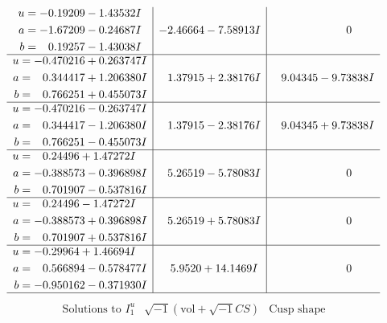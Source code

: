 \documentclass[1p]{elsarticle_modified}
\theoremstyle{definition}
\newcommand{\I}{\sqrt{-1}}
\begin{document}
$$\begin{array}{c|c|c}
\begin{aligned}
u &= -0.19209 - 1.43532 I \\
a &= -1.67209 - 0.24687 I \\
b &= \phantom{-}0.19257 - 1.43038 I\end{aligned}
 & -2.46664 - 7.58913 I & \phantom{-0.000000 } 0 \\ \hline\begin{aligned}
u &= -0.470216 + 0.263747 I \\
a &= \phantom{-}0.344417 + 1.206380 I \\
b &= \phantom{-}0.766251 + 0.455073 I\end{aligned}
 & \phantom{-}1.37915 + 2.38176 I & \phantom{-}9.04345 - 9.73838 I \\ \hline\begin{aligned}
u &= -0.470216 - 0.263747 I \\
a &= \phantom{-}0.344417 - 1.206380 I \\
b &= \phantom{-}0.766251 - 0.455073 I\end{aligned}
 & \phantom{-}1.37915 - 2.38176 I & \phantom{-}9.04345 + 9.73838 I \\ \hline\begin{aligned}
u &= \phantom{-}0.24496 + 1.47272 I \\
a &= -0.388573 - 0.396898 I \\
b &= \phantom{-}0.701907 - 0.537816 I\end{aligned}
 & \phantom{-}5.26519 - 5.78083 I & \phantom{-0.000000 } 0 \\ \hline\begin{aligned}
u &= \phantom{-}0.24496 - 1.47272 I \\
a &= -0.388573 + 0.396898 I \\
b &= \phantom{-}0.701907 + 0.537816 I\end{aligned}
 & \phantom{-}5.26519 + 5.78083 I & \phantom{-0.000000 } 0 \\ \hline\begin{aligned}
u &= -0.29964 + 1.46694 I \\
a &= \phantom{-}0.566894 - 0.578477 I \\
b &= -0.950162 - 0.371930 I\end{aligned}
 & \phantom{-}5.9520 + 14.1469 I & \phantom{-0.000000 } 0\\
 \hline 
 \end{array}$$\newpage$$\begin{array}{c|c|c}  
\text{Solutions to }I^u_{1}& \I (\text{vol} + \sqrt{-1}CS) & \text{Cusp shape}\\

\end{array}$$
\end{document}
